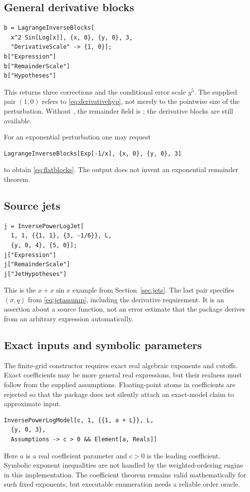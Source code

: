 \documentclass[11pt,a4paper]{article}
\numberwithin{equation}{section}
\theoremstyle{definition}\newtheorem{definition}[theorem]{Definition}
\theoremstyle{remark}\newtheorem{remark}[theorem]{Remark}
\newcommand{\code}[1]{\texttt{\detokenize{#1}}}
\begin{document}
\subsection{General derivative blocks}
\begin{lstlisting}
b = LagrangeInverseBlocks[
  x^2 Sin[Log[x]], {x, 0}, {y, 0}, 3,
  "DerivativeScale" -> {1, 0}];
b["Expression"]
b["RemainderScale"]
b["Hypotheses"]
\end{lstlisting}
This returns three corrections and the conditional error scale $y^5$. The supplied pair $(1,0)$ refers to \eqref{eq:derivativehyp}, not merely to the pointwise size of the perturbation. Without \code{"DerivativeScale"}, the remainder field is \code{Missing}; the derivative blocks are still available.

For an exponential perturbation one may request
\begin{lstlisting}
LagrangeInverseBlocks[Exp[-1/x], {x, 0}, {y, 0}, 3]
\end{lstlisting}
to obtain \eqref{eq:flatblocks}. The output does not invent an exponential remainder theorem.

\subsection{Source jets}
\begin{lstlisting}
j = InversePowerLogJet[
  1, 1, {{1, 1}, {3, -1/6}}, L,
  {y, 0, 4}, {5, 0}];
j["Expression"]
j["RemainderScale"]
j["JetHypotheses"]
\end{lstlisting}
This is the $x+x\sin x$ example from Section~\ref{sec:jets}. The last pair specifies $(\sigma,q)$ from \eqref{eq:jetassump}, including the derivative requirement. It is an assertion about a source function, not an error estimate that the package derives from an arbitrary expression automatically.

\subsection{Exact inputs and symbolic parameters}
The finite-grid constructor requires exact real algebraic exponents and cutoffs. Exact coefficients may be more general real expressions, but their realness must follow from the supplied assumptions. Floating-point \code{Real} atoms in coefficients are rejected so that the package does not silently attach an exact-model claim to approximate input.
\begin{lstlisting}
InversePowerLogModel[c, 1, {{1, a + L}}, L,
  {y, 0, 3},
  Assumptions -> c > 0 && Element[a, Reals]]
\end{lstlisting}
Here $a$ is a real coefficient parameter and $c>0$ is the leading coefficient. Symbolic exponent inequalities are not handled by the weighted-ordering engine in this implementation. The coefficient theorem remains valid mathematically for such fixed exponents, but executable enumeration needs a reliable order oracle.
\end{document}
